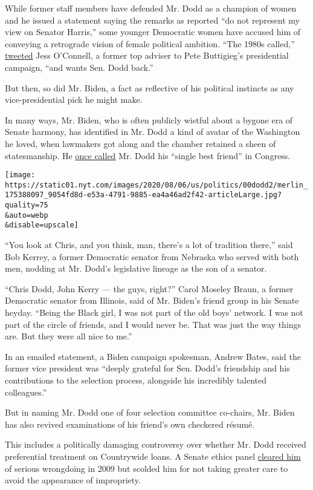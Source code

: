While former staff members have defended Mr. Dodd as a champion of women
and he issued a statement saying the remarks as reported ``do not
represent my view on Senator Harris,'' some younger Democratic women
have accused him of conveying a retrograde vision of female political
ambition. ``The 1980s called,''
\href{https://twitter.com/JessOConnell/status/1287749013077360642}{tweeted}
Jess O'Connell, a former top adviser to Pete Buttigieg's presidential
campaign, ``and wants Sen. Dodd back.''

But then, so did Mr. Biden, a fact as reflective of his political
instincts as any vice-presidential pick he might make.

In many ways, Mr. Biden, who is often publicly wistful about a bygone
era of Senate harmony, has identified in Mr. Dodd a kind of avatar of
the Washington he loved, when lawmakers got along and the chamber
retained a sheen of statesmanship. He
\href{https://www.courant.com/news/connecticut/hc-xpm-2009-10-06-biden-fairfield1006-art-story.html}{once
called} Mr. Dodd his ``single best friend'' in Congress.

\texttt{[image: https://static01.nyt.com/images/2020/08/06/us/politics/00dodd2/merlin\_175388097\_9054fd8d-e53a-4791-9885-ea4a46ad2f42-articleLarge.jpg?quality=75\\\&auto=webp\\\&disable=upscale]}

``You look at Chris, and you think, man, there's a lot of tradition
there,'' said Bob Kerrey, a former Democratic senator from Nebraska who
served with both men, nodding at Mr. Dodd's legislative lineage as the
son of a senator.

``Chris Dodd, John Kerry --- the guys, right?'' Carol Moseley Braun, a
former Democratic senator from Illinois, said of Mr. Biden's friend
group in his Senate heyday. ``Being the Black girl, I was not part of
the old boys' network. I was not part of the circle of friends, and I
would never be. That was just the way things are. But they were all nice
to me.''

In an emailed statement, a Biden campaign spokesman, Andrew Bates, said
the former vice president was ``deeply grateful for Sen. Dodd's
friendship and his contributions to the selection process, alongside his
incredibly talented colleagues.''

But in naming Mr. Dodd one of four selection committee co-chairs, Mr.
Biden has also revived examinations of his friend's own checkered
résumé.

This includes a politically damaging controversy over whether Mr. Dodd
received preferential treatment on Countrywide loans. A Senate ethics
panel
\href{https://www.nytimes.com/2009/08/08/us/politics/08ethics.html}{cleared
him} of serious wrongdoing in 2009 but scolded him for not taking
greater care to avoid the appearance of impropriety.

